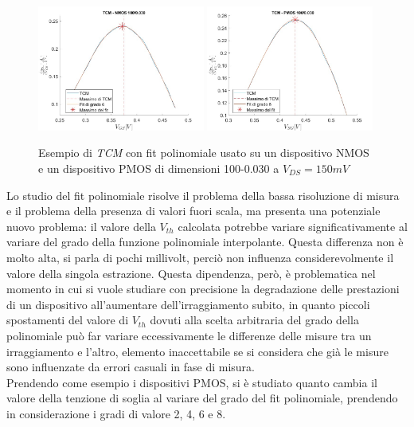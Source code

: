 \documentclass[
	a4paper,
	cleardoublepage=empty,
	headings=twolinechapter,
	numbers=autoenddot,
]{scrbook}
\begin{document}
\begin{figure}[H]
  \centering
  \includegraphics[width=0.49\textwidth]{TCM-N4-100-30}
  \includegraphics[width=0.49\textwidth]{TCM-P1-100-30}
  \caption{Esempio di \emph{TCM} con fit polinomiale usato su un dispositivo NMOS e un dispositivo PMOS di dimensioni 100-0.030 a $V_{DS} = 150 mV$}
\end{figure}

Lo
studio del fit polinomiale risolve il problema della bassa risoluzione di misura e il problema della presenza di valori fuori scala, ma presenta una potenziale nuovo problema: il valore della $V_{th}$ calcolata potrebbe variare significativamente al variare del grado della funzione polinomiale interpolante. Questa differenza non è molto alta, si parla di pochi millivolt, perciò non influenza considerevolmente il valore della singola estrazione. Questa dipendenza, però, è problematica nel momento in cui si vuole studiare con precisione la degradazione delle prestazioni di un dispositivo all'aumentare dell'irraggiamento subito, in quanto piccoli spostamenti del valore di $V_{th}$ dovuti alla scelta arbitraria del grado della polinomiale può far variare eccessivamente le differenze delle misure tra un irraggiamento e l'altro, elemento inaccettabile se si considera che già le misure sono influenzate da errori casuali in fase di misura.\\
Prendendo come esempio i dispositivi PMOS, si è studiato quanto cambia il valore della tenzione di soglia al variare del grado del fit polinomiale, prendendo in considerazione i gradi di valore 2, 4, 6 e 8.\\
\end{document}
